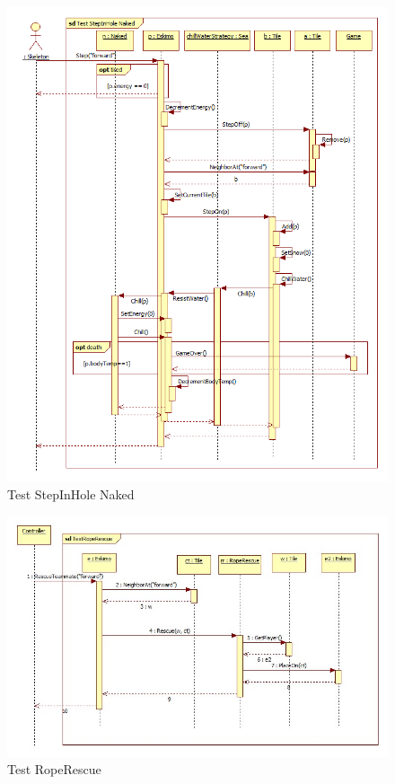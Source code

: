 \begin{figure}[h]
	\begin{center}
		\includegraphics[width=17cm]{chapters/chapter05/diagrams/Test_StepInHole_Naked.png}
		\caption{Test StepInHole Naked}
		\label{fig:Test StepInHole Naked}
	\end{center}
\end{figure}

\begin{figure}[h]
	\begin{center}
		\includegraphics[width=17cm]{chapters/chapter05/diagrams/Test_RopeRescue.jpg}
		\caption{Test RopeRescue}
		\label{fig:Test RopeRescue}
	\end{center}
\end{figure}

